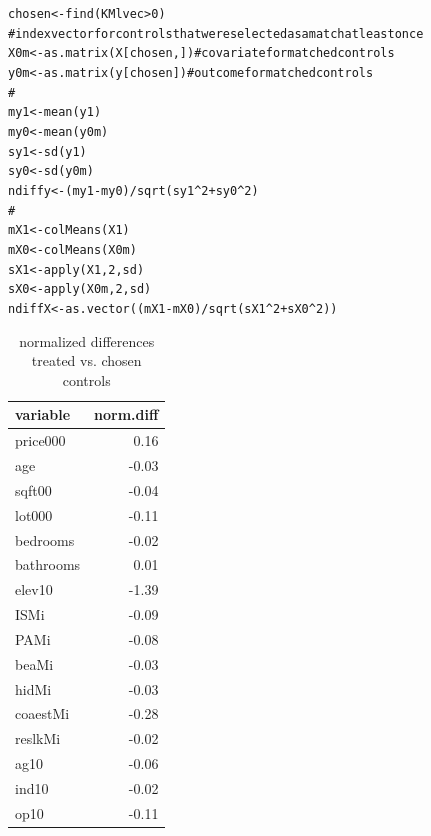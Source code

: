 \documentclass[11pt,reqno]{amsart}\usepackage[]{graphicx}\usepackage[]{color}
\makeatletter
\newcommand{\hlnum}[1]{\textcolor[rgb]{0.063,0.58,0.627}{#1}}%
\newcommand{\hlcom}[1]{\textcolor[rgb]{0.588,0.588,0.588}{#1}}%
\newcommand{\hlopt}[1]{\textcolor[rgb]{0.196,0.196,0.196}{#1}}%
\newcommand{\hlstd}[1]{\textcolor[rgb]{0.196,0.196,0.196}{#1}}%
\newcommand{\hlkwb}[1]{\textcolor[rgb]{0.627,0,0.314}{#1}}%
\newcommand{\hlkwd}[1]{\textcolor[rgb]{0.78,0.227,0.412}{#1}}%
\newenvironment{kframe}{%
 \def\at@end@of@kframe{}%
 \ifinner\ifhmode%
  \def\at@end@of@kframe{\end{minipage}}%
  \begin{minipage}{\columnwidth}%
 \fi\fi%
 \def\FrameCommand##1{\hskip\@totalleftmargin \hskip-\fboxsep
 \colorbox{shadecolor}{##1}\hskip-\fboxsep
     \hskip-\linewidth \hskip-\@totalleftmargin \hskip\columnwidth}%
 \MakeFramed {\advance\hsize-\width
   \@totalleftmargin\z@ \linewidth\hsize
   \@setminipage}}%
 {\par\unskip\endMakeFramed%
 \at@end@of@kframe}
\newcommand{\ksp}{\vspace{0.1in}}   %
\makeatother
\begin{document}
\begin{enumerate}
\begin{kframe}
\begin{alltt}
\hlstd{chosen} \hlkwb{<-} \hlkwd{find}\hlstd{(KMlvec} \hlopt{>} \hlnum{0}\hlstd{)}
\hlcom{#index vector for controls that were selected as a match at least once}
\hlstd{X0m} \hlkwb{<-} \hlkwd{as.matrix}\hlstd{(X[chosen, ])} \hlcom{#covariate for matched controls}
\hlstd{y0m} \hlkwb{<-} \hlkwd{as.matrix}\hlstd{(y[chosen])} \hlcom{#outcome for matched controls}
\hlcom{#}
\hlstd{my1} \hlkwb{<-} \hlkwd{mean}\hlstd{(y1)}
\hlstd{my0} \hlkwb{<-} \hlkwd{mean}\hlstd{(y0m)}
\hlstd{sy1} \hlkwb{<-} \hlkwd{sd}\hlstd{(y1)}
\hlstd{sy0} \hlkwb{<-} \hlkwd{sd}\hlstd{(y0m)}
\hlstd{ndiffy} \hlkwb{<-} \hlstd{(my1} \hlopt{-} \hlstd{my0)} \hlopt{/} \hlkwd{sqrt}\hlstd{(sy1} \hlopt{^} \hlnum{2} \hlopt{+} \hlstd{sy0} \hlopt{^} \hlnum{2}\hlstd{)}
\hlcom{#}
\hlstd{mX1} \hlkwb{<-} \hlkwd{colMeans}\hlstd{(X1)}
\hlstd{mX0} \hlkwb{<-} \hlkwd{colMeans}\hlstd{(X0m)}
\hlstd{sX1} \hlkwb{<-} \hlkwd{apply}\hlstd{(X1,} \hlnum{2}\hlstd{, sd)}
\hlstd{sX0} \hlkwb{<-} \hlkwd{apply}\hlstd{(X0m,} \hlnum{2}\hlstd{, sd)}
\hlstd{ndiffX} \hlkwb{<-} \hlkwd{as.vector}\hlstd{((mX1} \hlopt{-} \hlstd{mX0)} \hlopt{/} \hlkwd{sqrt}\hlstd{(sX1} \hlopt{^} \hlnum{2} \hlopt{+} \hlstd{sX0} \hlopt{^} \hlnum{2}\hlstd{))}
\end{alltt}
\end{kframe}
\ksp

\begin{table}[h!]
\centering
\caption{normalized differences treated vs. chosen controls} 
\begin{tabular}{lr}
  \hline
variable & norm.diff \\ 
  \hline
price000 & 0.16 \\ 
  age & -0.03 \\ 
  sqft00 & -0.04 \\ 
  lot000 & -0.11 \\ 
  bedrooms & -0.02 \\ 
  bathrooms & 0.01 \\ 
  elev10 & -1.39 \\ 
  ISMi & -0.09 \\ 
  PAMi & -0.08 \\ 
  beaMi & -0.03 \\ 
  hidMi & -0.03 \\ 
  coaestMi & -0.28 \\ 
  reslkMi & -0.02 \\ 
  ag10 & -0.06 \\ 
  ind10 & -0.02 \\ 
  op10 & -0.11 \\ 
   \hline
\end{tabular}
\end{table}


\end{enumerate}
\end{document}
